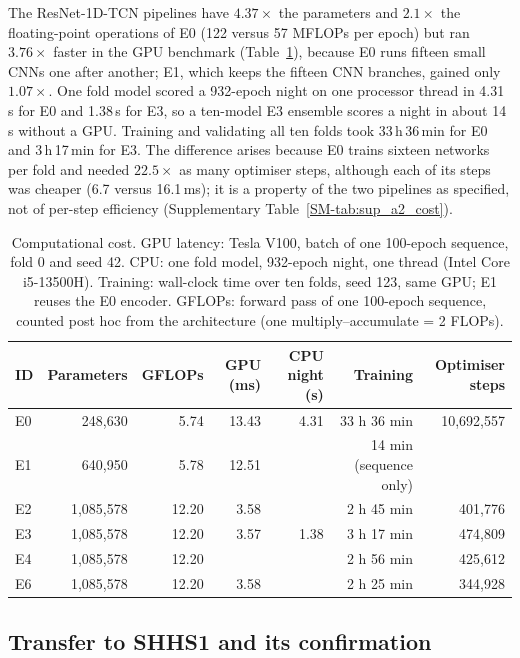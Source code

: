 \documentclass[11pt,a4paper]{article}
\begin{document}
The ResNet-1D-TCN pipelines have $4.37\times$ the parameters and $2.1\times$ the floating-point
operations of E0 (122 versus 57 MFLOPs per epoch) but ran $3.76\times$ faster in the GPU benchmark
(Table~\ref{tab:cost}), because E0 runs fifteen small CNNs one after another; E1, which keeps the fifteen CNN branches, gained only
$1.07\times$. One fold model scored a 932-epoch night on one processor thread in 4.31\,s for E0 and
1.38\,s for E3, so a ten-model E3 ensemble scores a night in about 14\,s without a GPU. Training and
validating all ten folds took 33\,h\,36\,min for E0 and 3\,h\,17\,min for E3. The difference arises
because E0 trains sixteen networks per fold and needed $22.5\times$ as many optimiser steps, although
each of its steps was cheaper (6.7 versus 16.1\,ms); it is a property of the two pipelines as
specified, not of per-step efficiency (Supplementary Table~\ref{SM-tab:sup_a2_cost}).

\begin{table}[t]
\centering
\caption{Computational cost. GPU latency: Tesla V100, batch of one 100-epoch sequence, fold 0 and
seed 42. CPU: one fold model, 932-epoch night, one thread (Intel Core i5-13500H). Training:
wall-clock time over ten folds, seed 123, same GPU; E1 reuses the E0 encoder. GFLOPs: forward pass of
one 100-epoch sequence, counted post hoc from the architecture (one multiply--accumulate = 2 FLOPs).}
\label{tab:cost}
\small
\begin{tabular}{lrrrrrr}
\toprule
\textbf{ID} & \textbf{Parameters} & \textbf{GFLOPs} & \textbf{GPU (ms)} & \textbf{CPU night (s)} & \textbf{Training} & \textbf{Optimiser steps} \\
\midrule
E0 & 248{,}630 & 5.74 & 13.43 & 4.31 & 33 h 36 min & 10{,}692{,}557 \\
E1 & 640{,}950 & 5.78 & 12.51 & & 14 min (sequence only) & \\
E2 & 1{,}085{,}578 & 12.20 & 3.58 & & 2 h 45 min & 401{,}776 \\
E3 & 1{,}085{,}578 & 12.20 & 3.57 & 1.38 & 3 h 17 min & 474{,}809 \\
E4 & 1{,}085{,}578 & 12.20 & & & 2 h 56 min & 425{,}612 \\
E6 & 1{,}085{,}578 & 12.20 & 3.58 & & 2 h 25 min & 344{,}928 \\
\bottomrule
\end{tabular}
\end{table}

\subsection{Transfer to SHHS1 and its confirmation}
\label{sec:holdout}
\end{document}
